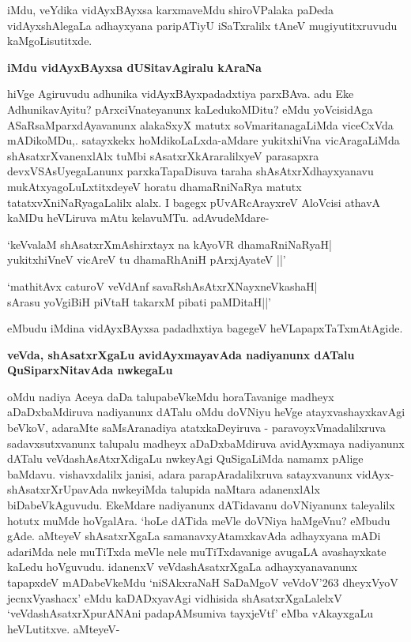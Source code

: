 iMdu, veYdika vidAyxBAyxsa karxmaveMdu shiroVPalaka paDeda vidAyxshAlegaLa adhayxyana paripATiyU iSaTxralilx tAneV mugiyutitxruvudu kaMgoLisutitxde.

\noindent
\textbf{iMdu vidAyxBAyxsa dUSitavAgiralu kAraNa}\label{page12}

hiVge Agiruvudu adhunika vidAyxBAyxpadadxtiya parxBAva. adu Eke AdhunikavAyitu? pArxciVnateyanunx kaLedukoMDitu? eMdu yoVcisidAga ASaRsaMparxdAyavanunx alakaSxyX matutx soVmaritanagaLiMda viceCxVda mADikoMDu,. satayxkekx hoMdikoLaLxda-aMdare yukitxhiVna vicAragaLiMda shAsatxrXvanenxlAlx tuMbi sAsatxrXkAraralilxyeV parasapxra devxVSAsUyegaLanunx parxkaTapaDisuva taraha shAsAtxrXdhayxyanavu mukAtxyagoLuLxtitxdeyeV horatu dhamaRniNaRya matutx tatatxvXniNaRyagaLalilx  alalx. I bagegx pUvARcArayxreV AloVcisi athavA kaMDu heVLiruva mAtu kelavuMTu. adAvudeMdare-

\begin{shloka}
`keVvalaM shAsatxrXmAshirxtayx na kAyoVR dhamaRniNaRyaH|\\\label{64}
yukitxhiVneV vicAreV tu dhamaRhAniH pArxjAyateV ||'
\end{shloka}
\begin{shloka}
`mathitAvx caturoV veVdAnf savaRshAsAtxrXNayxneVkashaH|\\\label{41}
sArasu yoVgiBiH piVtaH takarxM pibati paMDitaH||'
\end{shloka}
eMbudu iMdina vidAyxBAyxsa padadhxtiya bagegeV heVLapapxTaTxmAtAgide.

\noindent
\textbf{veVda, shAsatxrXgaLu avidAyxmayavAda nadiyanunx dATalu QuSiparxNitavAda nwkegaLu}\label{page42}

oMdu nadiya Aceya daDa talupabeVkeMdu horaTavanige madheyx aDaDxbaMdiruva nadiyanunx dATalu oMdu doVNiyu heVge atayxvashayxkavAgi beVkoV, adaraMte saMsAranadiya atatxkaDeyiruva - paravoyxVmadalilxruva sadavxsutxvanunx talupalu madheyx aDaDxbaMdiruva avidAyxmaya nadiyanunx dATalu veVdashAsAtxrXdigaLu nwkeyAgi QuSigaLiMda namamx pAlige baMdavu. vishavxdalilx janisi, adara parapAradalilxruva satayxvanunx vidAyx-shAsatxrXrUpavAda nwkeyiMda talupida naMtara adanenxlAlx biDabeVkAguvudu. EkeMdare nadiyanunx dATidavanu doVNiyanunx taleyalilx hotutx muMde hoVgalAra. `hoLe dATida meVle doVNiya haMgeVnu? eMbudu gAde. aMteyeV shAsatxrXgaLa samanavxyAtamxkavAda adhayxyana mADi adariMda nele muTiTxda meVle nele muTiTxdavanige avugaLA avashayxkate kaLedu hoVguvudu. idanenxV veVdashAsatxrXgaLa adhayxyanavanunx tapapxdeV mADabeVkeMdu `niSAkxraNaH SaDaMgoV\label{42} veVdoV\char'263 dheyxVyoV jecnxVyashacx' eMdu kaDADxyavAgi vidhisida shAsatxrXgaLalelxV  `veVdashAsatxrXpurANAni padapAMsumiva tayxjeVtf'\label{42} eMba vAkayxgaLu heVLutitxve. aMteyeV-

